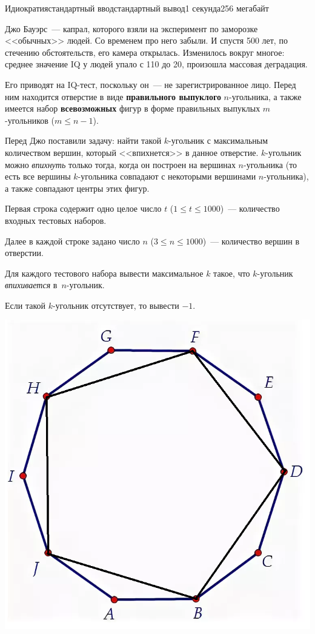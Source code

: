 \begin{problem}{Идиократия}{стандартный ввод}{стандартный вывод}{1 секунда}{256 мегабайт}

Джо Бауэрс~--- капрал, которого взяли на эксперимент по заморозке <<обычных>> людей. Со временем про него забыли. И спустя 500 лет, по стечению обстоятельств, его камера открылась. Изменилось вокруг многое: среднее значение IQ у людей упало с 110 до 20, произошла массовая деградация.

Его приводят на IQ-тест, поскольку он~--- не зарегистрированное лицо. Перед ним находится отверстие в виде \textbf{правильного выпуклого} $n$-угольника, а также имеется набор \textbf{всевозможных} фигур в форме правильных выпуклых $m$-угольников ($m \le n - 1$). 

Перед Джо поставили задачу: найти такой $k$-угольник с максимальным количеством вершин, который <<впихнется>> в данное отверстие. $k$-угольник можно \textit{впихнуть} только тогда, когда он построен на вершинах $n$-угольника (то есть все вершины $k$-угольника совпадают с некоторыми вершинами $n$-угольника), а также совпадают центры этих фигур.

\InputFile
Первая строка содержит одно целое число $t$ ($1 \le t \le 1000$)~--- количество входных тестовых наборов.

Далее в каждой строке задано число $n$ ($3 \le n \le 1000$)~--- количество вершин в отверстии.

\OutputFile
Для каждого тестового набора вывести максимальное $k$ такое, что $k$-угольник \textit{впихивается} в~$n$-угольник.

Если такой $k$-угольник отсутствует, то вывести $-1$.



\Example

\begin{example}
%
\end{example}

\Note
\centerline{\includegraphics[scale=.35]{TaskCF.png}}


\end{problem}
